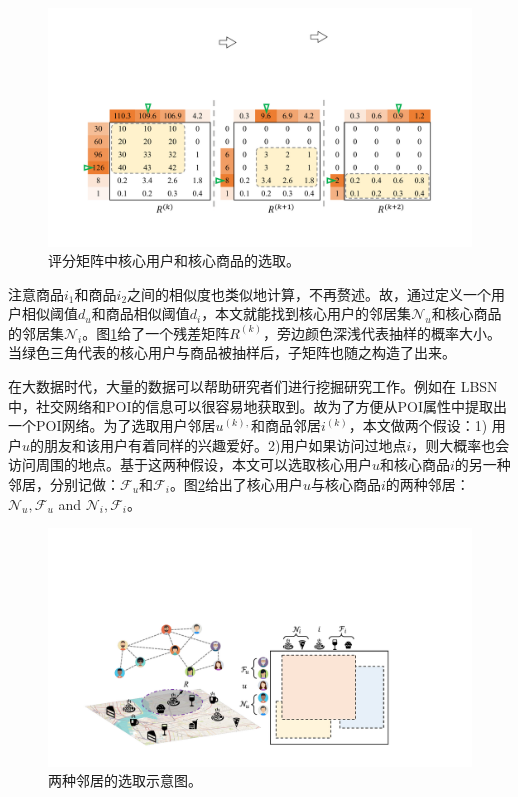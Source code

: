 \begin{figure}[t!]
\includegraphics[width=\textwidth]{pics/MF.pdf}
\caption{评分矩阵中核心用户和核心商品的选取。} \label{MF}
\end{figure}
\noindent 注意商品$i_1$和商品$i_2$之间的相似度也类似地计算，不再赘述。故，通过定义一个用户相似阈值$d_u$和商品相似阈值$d_i$，本文就能找到核心用户的邻居集$\mathcal{N}_u$和核心商品的邻居集$\mathcal{N}_i$。图\ref{MF}给了一个残差矩阵$R^{(k)}$，旁边颜色深浅代表抽样的概率大小。当绿色三角代表的核心用户与商品被抽样后，子矩阵也随之构造了出来。

在大数据时代，大量的数据可以帮助研究者们进行挖掘研究工作。例如在 LBSN中，社交网络和POI的信息可以很容易地获取到。故为了方便从POI属性中提取出一个POI网络。为了选取用户邻居$u^{(k),}$和商品邻居$i^{(k)}$，本文做两个假设：1) 用户$u$的朋友和该用户有着同样的兴趣爱好。2)用户如果访问过地点$i$，则大概率也会访问周围的地点。基于这两种假设，本文可以选取核心用户$u$和核心商品$i$的另一种邻居，分别记做：$\mathcal{F}_u$和$\mathcal{F}_i$。图\ref{BLOMA}给出了核心用户$u$与核心商品$i$的两种邻居：$\mathcal{N}_u, \mathcal{F}_u$ and $\mathcal{N}_i, \mathcal{F}_i$。



\begin{figure}[t!]
\includegraphics[width=\textwidth]{pics/BLOMA.pdf}
\caption{两种邻居的选取示意图。} 
\label{BLOMA}
\end{figure}
